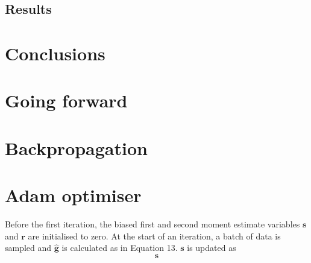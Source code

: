 \documentclass[12pt]{article}
\begin{document}
\subsection{Results}

\section{Conclusions}

\section{Going forward}




\appendix
\appendixpage
\section{Backpropagation}
\section{Adam optimiser}
Before the first iteration, the biased first and second moment estimate variables $\bm{s}$ and $\bm{r}$ are initialised to zero. At the start of an iteration, a batch of data is sampled and $\hat{\bm{g}}$ is calculated as in Equation 13. $\bm{s}$ is updated as
\begin{equation}
\bm{s}
\end{equation}        
\end{document}
